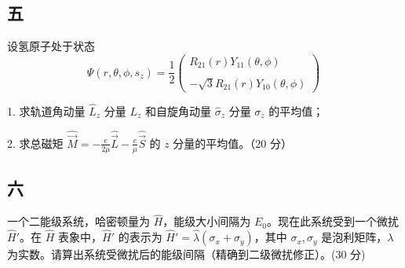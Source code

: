 \subsection{五}
设氢原子处于状态
\begin{equation}
\Psi (r, \theta, \phi, s_z) = \frac{1}{2}
 \begin{pmatrix}
R_{21}(r)Y_{11}(\theta, \phi) \\\\
-\sqrt{3}R_{21}(r)Y_{10}(\theta, \phi)
\end{pmatrix}~
\end{equation}

1. 求轨道角动量 $\hat{L}_z$ 分量 $L_z$ 和自旋角动量 $\hat{\sigma}_z$ 分量 $\sigma_z$ 的平均值；

2. 求总磁矩 $\hat{\vec M} = -\frac{e}{2\mu} \hat{\vec L} - \frac{e}{\mu} \hat{\vec S}$ 的 $z$ 分量的平均值。（20 分）

\subsection{六}
一个二能级系统，哈密顿量为 $\hat{H}$，能级大小间隔为 $E_0$。现在此系统受到一个微扰 $\hat{H}'$。在 $\hat{H}$ 表象中，$\hat{H}'$ 的表示为 $\hat{H}'=\hat\lambda(\sigma_x + \sigma_y)$，其中 $\sigma_x,\sigma_y$ 是泡利矩阵，$\lambda$ 为实数。请算出系统受微扰后的能级间隔（精确到二级微扰修正）。(30 分)
